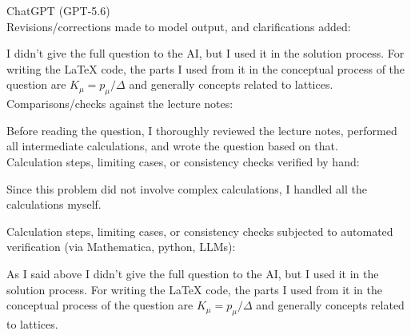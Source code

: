 \documentclass[12pt]{report}
\begin{document}
ChatGPT (GPT-5.6)\\

Revisions/corrections made to model output, and clarifications added:

I didn't give the full question to the AI, but I used it in the solution process. For writing the LaTeX code, the parts I used from it in the conceptual process of the question are $K_\mu=p_\mu/\Delta$ and generally concepts related to lattices.\\

Comparisons/checks against the lecture notes:

Before reading the question, I thoroughly reviewed the lecture notes, performed all intermediate calculations, and wrote the question based on that.\\

Calculation steps, limiting cases, or consistency checks verified by hand:

Since this problem did not involve complex calculations, I handled all the calculations myself.

Calculation steps, limiting cases, or consistency checks subjected to automated verification (via Mathematica, python, LLMs):

As I said above I didn't give the full question to the AI, but I used it in the solution process. For writing the LaTeX code, the parts I used from it in the conceptual process of the question are $K_\mu=p_\mu/\Delta$ and generally concepts related to lattices.\\
\end{document}
